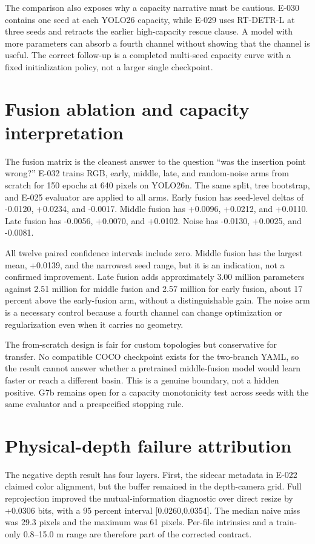 \documentclass[preprint,12pt]{elsarticle}
\begin{document}
The comparison also exposes why a capacity narrative must be cautious. E-030
contains one seed at each YOLO26 capacity, while E-029 uses RT-DETR-L at three
seeds and retracts the earlier high-capacity rescue clause. A model with more
parameters can absorb a fourth channel without showing that the channel is
useful. The correct follow-up is a completed multi-seed capacity curve with a
fixed initialization policy, not a larger single checkpoint.

\section{Fusion ablation and capacity interpretation}
\label{sec:fusion-interpretation}
The fusion matrix is the cleanest answer to the question ``was the insertion
point wrong?'' E-032 trains RGB, early, middle, late, and random-noise arms
from scratch for 150 epochs at 640 pixels on YOLO26n. The same split, tree
bootstrap, and E-025 evaluator are applied to all arms. Early fusion has
seed-level deltas of -0.0120, +0.0234, and -0.0017. Middle fusion has
+0.0096, +0.0212, and +0.0110. Late fusion has -0.0056, +0.0070, and
+0.0102. Noise has -0.0130, +0.0025, and -0.0081.

All twelve paired confidence intervals include zero. Middle fusion has the
largest mean, +0.0139, and the narrowest seed range, but it is an indication,
not a confirmed improvement. Late fusion adds approximately 3.00 million
parameters against 2.51 million for middle fusion and 2.57 million for early
fusion, about 17 percent above the early-fusion arm, without a distinguishable
gain. The noise arm is a necessary control because a fourth channel can change
optimization or regularization even when it carries no geometry.

The from-scratch design is fair for custom topologies but conservative for
transfer. No compatible COCO checkpoint exists for the two-branch YAML, so
the result cannot answer whether a pretrained middle-fusion model would learn
faster or reach a different basin. This is a genuine boundary, not a hidden
positive. G7b remains open for a capacity monotonicity test across seeds with
the same evaluator and a prespecified stopping rule.

\section{Physical-depth failure attribution}
\label{sec:depth-attribution}
The negative depth result has four layers. First, the sidecar metadata in
E-022 claimed color alignment, but the buffer remained in the depth-camera
grid. Full reprojection improved the mutual-information diagnostic over direct
resize by +0.0306 bits, with a 95 percent interval [0.0260,0.0354]. The
median naive
miss was 29.3 pixels and the maximum was 61 pixels. Per-file intrinsics and a
train-only 0.8--15.0 m range are therefore part of the corrected contract.
\end{document}
